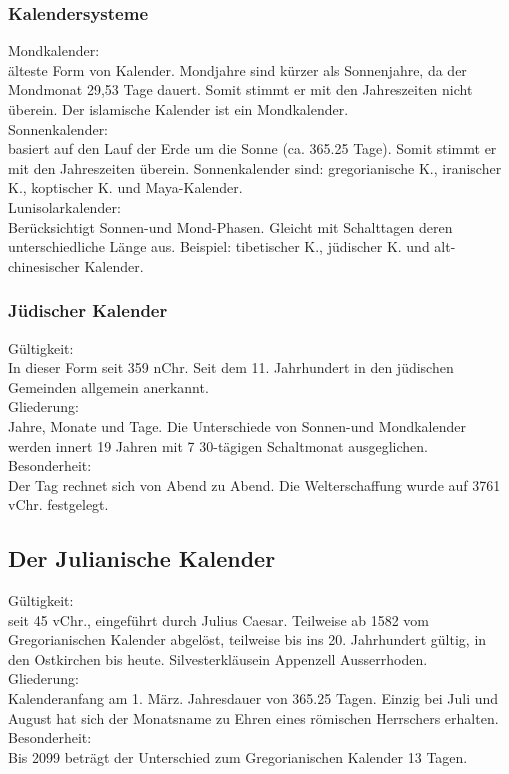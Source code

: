 \documentclass[10pt, openright=true]{scrartcl}
\begin{document}
\subsubsection{Kalendersysteme}
Mondkalender:\\
älteste Form von Kalender. Mondjahre sind kürzer als Sonnenjahre, da der Mondmonat 29,53 Tage dauert. Somit stimmt er mit den Jahreszeiten nicht überein. Der islamische Kalender ist ein Mondkalender.\\
Sonnenkalender:\\
basiert auf den Lauf der Erde um die Sonne (ca. 365.25 Tage). Somit stimmt er mit den Jahreszeiten überein. Sonnenkalender sind: gregorianische K., iranischer K., koptischer K. und Maya-Kalender.\\
Lunisolarkalender:\\
Berücksichtigt Sonnen-und Mond-Phasen. Gleicht mit Schalttagen deren unterschiedliche Länge aus. Beispiel: tibetischer K., jüdischer K. und alt-chinesischer Kalender.
\subsubsection{Jüdischer Kalender}
Gültigkeit:\\
In dieser Form seit 359 nChr. Seit dem 11. Jahrhundert in den jüdischen Gemeinden allgemein anerkannt.\\
Gliederung:\\
Jahre, Monate und Tage. Die Unterschiede von Sonnen-und Mondkalender werden innert 19 Jahren mit 7 30-tägigen Schaltmonat ausgeglichen.\\
Besonderheit:\\
Der Tag rechnet sich von Abend zu Abend. Die Welterschaffung wurde auf 3761 vChr. festgelegt.
\subsection{Der Julianische Kalender} 
Gültigkeit:\\
seit 45 vChr., eingeführt durch Julius Caesar. Teilweise ab 1582 vom Gregorianischen Kalender abgelöst, teilweise bis ins 20. Jahrhundert gültig, in den Ostkirchen bis heute. Silvesterkläusein Appenzell Ausserrhoden.\\
Gliederung:\\
Kalenderanfang am 1. März. Jahresdauer von 365.25 Tagen. Einzig bei Juli und August hat sich der Monatsname zu Ehren eines römischen Herrschers erhalten.\\
Besonderheit:\\
Bis 2099 beträgt der Unterschied zum Gregorianischen Kalender 13 Tagen.
\end{document}
